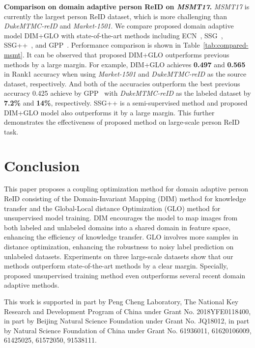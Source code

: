 \documentclass[sigconf]{acmart}
\begin{document}
\textbf{Comparison on domain adaptive person ReID on \textit{MSMT17}.}
\textit{MSMT17} is currently the largest person ReID dataset, which is more challenging than \textit{DukeMTMC-reID} and \textit{Market-1501}. We compare proposed domain adaptive model DIM+GLO with state-of-the-art methods including ECN~\cite{zhong2019invariance}, SSG~\cite{ssg}, SSG++~\cite{ssg}, and GPP~\cite{zhong2019learning}. Performance comparison is shown in Table~\ref{tab:compared-msmt}. It can be observed that proposed DIM+GLO outperforms previous methods by a large margin. For example, DIM+GLO achieves \textbf{0.497} and \textbf{0.565} in Rank1 accuracy when using \textit{Market-1501} and \textit{DukeMTMC-reID} as the  source dataset, respectively. And both of the accuracies outperform the best previous accuracy 0.425 achieve by GPP~\cite{zhong2019learning} with \textit{DukeMTMC-reID} as the labeled dataset by \textbf{7.2\%} and \textbf{14\%}, respectively. SSG++ is a semi-supervised method and proposed DIM+GLO model also outperforms it by a large margin. This further demonstrates the effectiveness of proposed method on large-scale person ReID task.

\section{Conclusion}
This paper proposes a coupling optimization method for domain adaptive person ReID consisting of the Domain-Invariant Mapping (DIM) method for knowledge transfer and the Global-Local distance Optimization (GLO) method for unsupervised model training. DIM encourages the model to map images from both labeled and unlabeled domains into a shared domain in feature space, enhancing the efficiency of knowledge transfer. GLO involves more samples in distance optimization, enhancing the robustness to noisy label prediction on unlabeled datasets. Experiments on three large-scale datasets show that our methods outperform state-of-the-art methods by a clear margin. Specially, proposed unsupervised training method even outperforms several recent domain adaptive methods.


\begin{acks}
This work is supported in part by Peng Cheng Laboratory, The National Key Research and Development Program of China under Grant No. 2018YFE0118400, in part by Beijing Natural Science Foundation under Grant No. JQ18012, in part by Natural Science Foundation of China under Grant No. 61936011, 61620106009, 61425025, 61572050, 91538111.
\end{acks}

\balance


\end{document}

